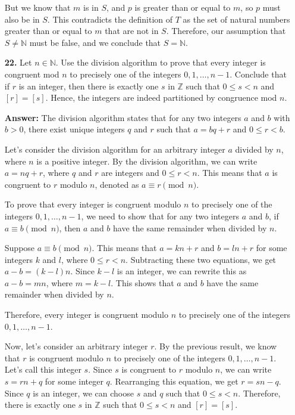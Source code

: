 \documentclass[12pt,reqno]{amsart}
\begin{document}
\begin{enumerate}
But we know that $m$ is in $S$, and $p$ is greater than or equal to $m$, so $p$ must also be in $S$. This contradicts the definition of $T$ as the set of natural numbers greater than or equal to $m$ that are not in $S$. Therefore, our assumption that $S \neq \mathbb{N}$ must be false, and we conclude that $S = \mathbb{N}$.

\bigskip

\item[{\bf 22.}]
Let $n \in {\mathbb N}$.  Use the division algorithm to prove that every integer is congruent mod $n$ to precisely one of the integers $0, 1, \ldots, n-1$.  Conclude that if $r$ is an integer, then there is exactly one $s$ in ${\mathbb Z}$ such that $0 \leq s < n$ and $[r] = [s]$.   Hence, the integers are indeed partitioned by congruence mod $n$. 

\textbf{Answer:} The division algorithm states that for any two integers $a$ and $b$ with $b > 0$, there exist unique integers $q$ and $r$ such that $a = bq + r$ and $0 \leq r < b$.

Let's consider the division algorithm for an arbitrary integer $a$ divided by $n$, where $n$ is a positive integer. By the division algorithm, we can write $a = nq + r$, where $q$ and $r$ are integers and $0 \leq r < n$. This means that $a$ is congruent to $r$ modulo $n$, denoted as $a \equiv r \pmod{n}$.

To prove that every integer is congruent modulo $n$ to precisely one of the integers $0, 1, \ldots, n-1$, we need to show that for any two integers $a$ and $b$, if $a \equiv b \pmod{n}$, then $a$ and $b$ have the same remainder when divided by $n$. 

Suppose $a \equiv b \pmod{n}$. This means that $a = kn + r$ and $b = ln + r$ for some integers $k$ and $l$, where $0 \leq r < n$. Subtracting these two equations, we get $a - b = (k - l)n$. Since $k - l$ is an integer, we can rewrite this as $a - b = mn$, where $m = k - l$. This shows that $a$ and $b$ have the same remainder when divided by $n$.

Therefore, every integer is congruent modulo $n$ to precisely one of the integers $0, 1, \ldots, n-1$. 

Now, let's consider an arbitrary integer $r$. By the previous result, we know that $r$ is congruent modulo $n$ to precisely one of the integers $0, 1, \ldots, n-1$. Let's call this integer $s$. Since $s$ is congruent to $r$ modulo $n$, we can write $s = rn + q$ for some integer $q$. Rearranging this equation, we get $r = sn - q$. Since $q$ is an integer, we can choose $s$ and $q$ such that $0 \leq s < n$. Therefore, there is exactly one $s$ in $\mathbb{Z}$ such that $0 \leq s < n$ and $[r] = [s]$.


\end{enumerate}
\end{document}
